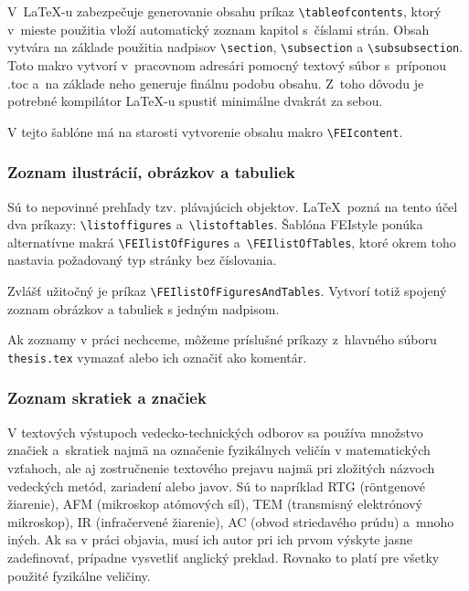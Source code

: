 \documentclass[../../../thesis.tex]{subfiles}
\begin{document}
V~\LaTeX-u zabezpečuje generovanie obsahu príkaz \verb|\tableofcontents|,
ktorý v~mieste použitia vloží automatický zoznam kapitol s~číslami strán.
Obsah vytvára na základe použitia nadpisov \verb|\section|,
\verb|\subsection| a \verb|\subsubsection|.
Toto makro vytvorí v~pracovnom adresári pomocný textový súbor
s~príponou .toc a~na základe neho generuje finálnu podobu obsahu.
Z~toho dôvodu je potrebné kompilátor \LaTeX-u
spustiť minimálne dvakrát za sebou.

V tejto šablóne má na starosti vytvorenie obsahu makro \verb|\FEIcontent|.

\subsubsection*{\normalsize Zoznam ilustrácií,
obrázkov a tabuliek}
Sú to nepovinné prehľady tzv. plávajúcich objektov.
\LaTeX\ pozná na tento účel dva príkazy: \verb|\listoffigures| a~\verb|\listoftables|. Šablóna FEIstyle ponúka alternatívne makrá \verb|\FEIlistOfFigures| a~\verb|\FEIlistOfTables|, ktoré okrem toho nastavia požadovaný typ stránky bez číslovania.

Zvlášť užitočný je príkaz \verb|\FEIlistOfFiguresAndTables|.
Vytvorí totiž spojený zoznam obrázkov a tabuliek s jedným nadpisom.

Ak zoznamy v práci nechceme, môžeme príslušné príkazy z~hlavného súboru \verb|thesis.tex| vymazať alebo ich označiť ako komentár.

\subsubsection*{\normalsize Zoznam skratiek a značiek}
V textových výstupoch vedecko-technických odborov sa používa
množstvo značiek a~skratiek najmä na označenie fyzikálnych
veličín v matematických vzťahoch,
ale aj zostručnenie textového prejavu najmä pri zložitých názvoch
vedeckých metód, zariadení alebo javov.
Sú to napríklad RTG (röntgenové žiarenie),
AFM (mikroskop atómových síl),
TEM (transmisný elektrónový mikroskop),
IR (infračervené žiarenie),
AC (obvod striedavého prúdu) a~mnoho iných.
Ak sa v práci objavia, musí ich autor pri ich prvom výskyte
jasne zadefinovať,
prípadne vysvetliť anglický preklad.
Rovnako to platí pre všetky použité fyzikálne veličiny.
\end{document}
